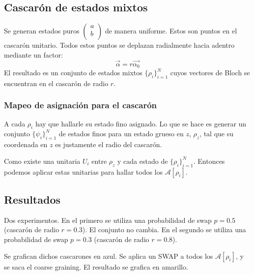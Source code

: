 \documentclass[onecolumn,11pt]{article}
\newcommand{\mcA}{\mathcal{A}}
\begin{document}
\subsection{Cascarón de estados mixtos}
Se generan estados puros $\begin{pmatrix}
a\\
b\\ \end{pmatrix}$ de manera uniforme. Estos son puntos en el cascarón unitario. Todos estos puntos se deplazan radialmente hacia adentro mediante un factor:
\begin{equation}
\vec{\alpha}=r\vec{\alpha_{0}}
\end{equation}
El resultado es un conjunto de estados mixtos $\{\rho_{i}\}_{i=1}^{N}$ cuyos vectores de Bloch se encuentran en el cascarón de radio $r$.

\subsubsection{Mapeo de asignación para el cascarón}


A cada $\rho_{i}$ hay que hallarle su estado fino asignado. Lo que se hace es generar un conjunto $\{\psi_{i}\}_{i=1}^{N}$ de estados finos para un estado grueso en $z$, $\rho_{z}$, tal que su coordenada en $z$ es justamente el radio del cascarón.

Como existe una unitaria $U_{i}$ entre $\rho_{z}$ y cada estado de $\{\rho_{i}\}_{i=1}^{N}$. Entonces podemos aplicar estas unitarias para hallar todos los $\mcA[\rho_{i}]$.

\subsection{Resultados}

Dos experimentos. En el primero se utiliza una probabilidad de swap $p=0.5$ (cascarón de radio $r=0.3$). El conjunto no cambia. En el segundo se utiliza una probabilidad de swap $p=0.3$ (cascarón de radio $r=0.8$).

Se grafican dichos cascarones en azul. Se aplica un SWAP a todos los $\mcA[\rho_{i}]$, y se saca el coarse graining. El resultado se grafica en amarillo.
\end{document}
